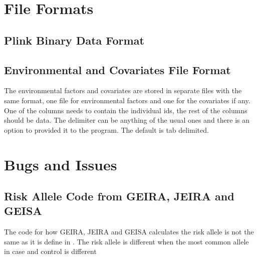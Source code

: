 \documentclass[10pt,a4paper]{report}
\begin{document}
\begin{appendices}
\chapter{File Formats}

\section{Plink Binary Data Format}

\section{Environmental and Covariates File Format}
The environmental factors and covariates are stored in separate files with the same format, one file for environmental factors and one for the covariates if any. One of the columns needs to contain the individual ids, the rest of the columns should be data. The delimiter can be anything of the usual ones and there is an option to provided it to the program. The default is tab delimited.

\chapter{Bugs and Issues}

\section{Risk Allele Code from GEIRA, JEIRA and GEISA}
\label{geira_jeira_risk_allele}
The code for how GEIRA, JEIRA and GEISA calculates the risk allele is not the same as it is define in \cite{geira, uvehag_master_thesis}. The risk allele is different when the most common allele in case and control is different

\begin{algorithm}
\DontPrintSemicolon
{}
\BlankLine \BlankLine


\BlankLine \BlankLine



\end{algorithm}
\end{appendices}
\end{document}
